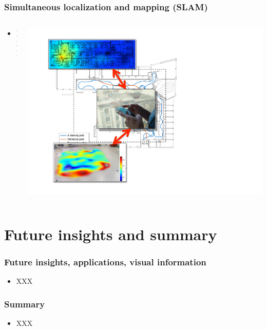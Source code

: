 \documentclass[xcolor=svgnames,english,handout]{beamer}
\begin{document}


\begin{frame}
  \frametitle{Simultaneous localization and mapping (SLAM)}

  \begin{columns}
  \begin{column}{0.5\textwidth}
  \begin{itemize}[<+->]       
  \item XXX
  \end{itemize}
  \end{column}
  \begin{column}{0.5\textwidth}
  \includegraphics[width=\columnwidth]{slam} \\
  \end{column}
  \end{columns}
\end{frame}


\section{Future insights and summary}

\begin{frame}
  \frametitle{Future insights, applications, visual information}

  \begin{itemize}[<+->]       
  \item XXX
  \end{itemize}
\end{frame}

\begin{frame}
  \frametitle{Summary}

  \begin{itemize}[<+->]       
  \item XXX
  \end{itemize}
\end{frame}
\end{document}
